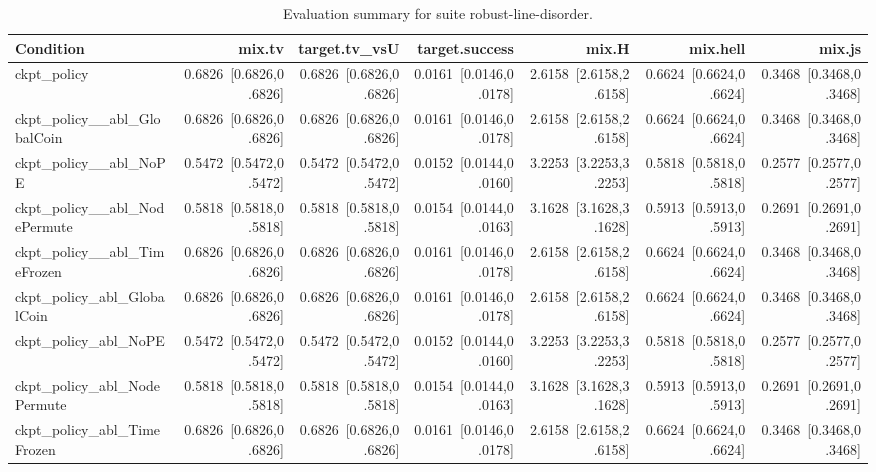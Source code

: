 \begin{table}[t]
\centering
\caption{Evaluation summary for suite robust-line-disorder.}
\label{tab:eval_robust-line-disorder}
\begin{tabular}{lrrrrrr}
\toprule
Condition & mix.tv & target.tv\_vsU & target.success & mix.H & mix.hell & mix.js \\
\midrule
ckpt\_policy & 0.6826~[0.6826,0.6826] & 0.6826~[0.6826,0.6826] & 0.0161~[0.0146,0.0178] & 2.6158~[2.6158,2.6158] & 0.6624~[0.6624,0.6624] & 0.3468~[0.3468,0.3468] \\
ckpt\_policy\_\_abl\_GlobalCoin & 0.6826~[0.6826,0.6826] & 0.6826~[0.6826,0.6826] & 0.0161~[0.0146,0.0178] & 2.6158~[2.6158,2.6158] & 0.6624~[0.6624,0.6624] & 0.3468~[0.3468,0.3468] \\
ckpt\_policy\_\_abl\_NoPE & 0.5472~[0.5472,0.5472] & 0.5472~[0.5472,0.5472] & 0.0152~[0.0144,0.0160] & 3.2253~[3.2253,3.2253] & 0.5818~[0.5818,0.5818] & 0.2577~[0.2577,0.2577] \\
ckpt\_policy\_\_abl\_NodePermute & 0.5818~[0.5818,0.5818] & 0.5818~[0.5818,0.5818] & 0.0154~[0.0144,0.0163] & 3.1628~[3.1628,3.1628] & 0.5913~[0.5913,0.5913] & 0.2691~[0.2691,0.2691] \\
ckpt\_policy\_\_abl\_TimeFrozen & 0.6826~[0.6826,0.6826] & 0.6826~[0.6826,0.6826] & 0.0161~[0.0146,0.0178] & 2.6158~[2.6158,2.6158] & 0.6624~[0.6624,0.6624] & 0.3468~[0.3468,0.3468] \\
ckpt\_policy\_abl\_GlobalCoin & 0.6826~[0.6826,0.6826] & 0.6826~[0.6826,0.6826] & 0.0161~[0.0146,0.0178] & 2.6158~[2.6158,2.6158] & 0.6624~[0.6624,0.6624] & 0.3468~[0.3468,0.3468] \\
ckpt\_policy\_abl\_NoPE & 0.5472~[0.5472,0.5472] & 0.5472~[0.5472,0.5472] & 0.0152~[0.0144,0.0160] & 3.2253~[3.2253,3.2253] & 0.5818~[0.5818,0.5818] & 0.2577~[0.2577,0.2577] \\
ckpt\_policy\_abl\_NodePermute & 0.5818~[0.5818,0.5818] & 0.5818~[0.5818,0.5818] & 0.0154~[0.0144,0.0163] & 3.1628~[3.1628,3.1628] & 0.5913~[0.5913,0.5913] & 0.2691~[0.2691,0.2691] \\
ckpt\_policy\_abl\_TimeFrozen & 0.6826~[0.6826,0.6826] & 0.6826~[0.6826,0.6826] & 0.0161~[0.0146,0.0178] & 2.6158~[2.6158,2.6158] & 0.6624~[0.6624,0.6624] & 0.3468~[0.3468,0.3468] \\
\bottomrule
\end{tabular}
\end{table}
